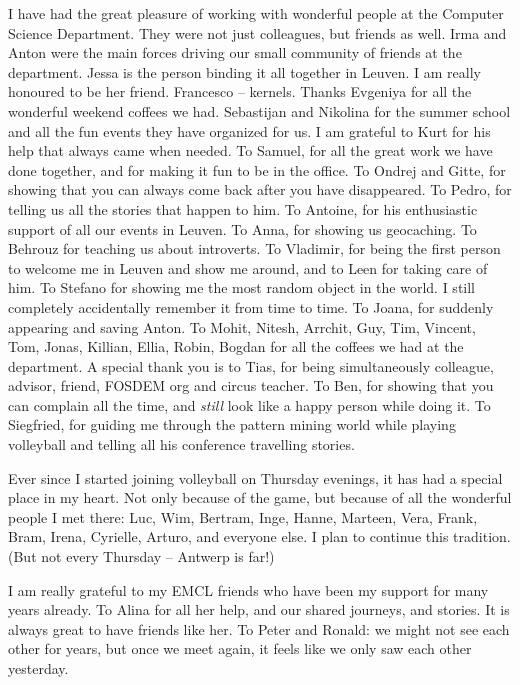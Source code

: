 I have had the great pleasure of working with wonderful people at the Computer Science Department. They were not just colleagues, but friends as well. Irma and Anton were the main forces driving our small community of friends at the department. Jessa is the person binding it all together in Leuven. I am really honoured to be her friend. Francesco -- kernels. Thanks Evgeniya for all the wonderful weekend coffees we had. Sebastijan and Nikolina for the summer school and all the fun events they have organized for us. I am grateful to Kurt for his help that always came when needed. To Samuel, for all the great work we have done together, and for making it fun to be in the office. To Ondrej and Gitte, for showing that you can always come back after you have disappeared. To Pedro, for telling us all the stories that happen to him. To Antoine, for his enthusiastic support of all our events in Leuven. To Anna, for showing us geocaching. To Behrouz for teaching us about introverts. To Vladimir, for being the first person to welcome me in Leuven and show me around, and to Leen for taking care of him. To Stefano for showing me the most random object in the world. I still completely accidentally remember it from time to time. To Joana, for suddenly appearing and saving Anton. To Mohit, Nitesh, Arrchit, Guy, Tim, Vincent, Tom, Jonas, Killian, Ellia, Robin, Bogdan for all the coffees we had at the department. A special thank you is to Tias, for being simultaneously colleague, advisor, friend, FOSDEM org and circus teacher. To Ben, for showing that you can complain all the time, and \textit{still} look like a happy person while doing it. To Siegfried, for guiding me through the pattern mining world while playing volleyball and telling all his conference travelling stories.

Ever since I started joining volleyball on Thursday evenings, it has had a special place in my heart. Not only because of the game, but because of all the wonderful people I met there: Luc, Wim, Bertram, Inge, Hanne, Marteen, Vera, Frank, Bram, Irena, Cyrielle, Arturo, and everyone else. I plan to continue this tradition. (But not every Thursday -- Antwerp is far!)

I am really grateful to my EMCL friends who have been my support for many years already. To Alina for all her help, and our shared journeys, and stories. It is always great to have friends like her. To Peter and Ronald: we might not see each other for years, but once we meet again, it feels like we only saw each other yesterday. 

